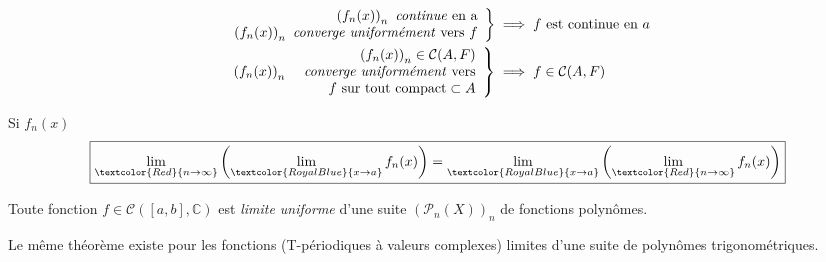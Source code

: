 \documentclass[11pt,a4paper,fleqn,pdftex]{report}
\begin{document}
\begin{theorem}

\begin{align*}
\left.
\begin{array}{r}
\left(f_n(x)\right)_{n}\text{ \emph{continue} en a}\\
\left(f_n(x)\right)_n\text{ \emph{converge uniformément} vers }f\\
\end{array}\right\rbrace &\implies f\text{ est continue en }a\\
\left.
\begin{array}{r r}
&\left(f_n(x)\right)_{n}\in\mathcal{C}(A,F)\\
\left(f_n(x)\right)_n&\text{ \emph{converge uniformément} vers}\\
&f \text{ sur tout compact} \subset A\\
\end{array}\right\rbrace &\implies f\in \mathcal{C}(A,F)\\
\end{align*}
\end{theorem}
\begin{itheorem}\label{Double Limite Fonctions} 
Si $f_n(x)$ 
\[\boxed{
\lim_{\textcolor{Red}{n\to\infty}}\left(\lim_{\textcolor{RoyalBlue}{x\to a}} f_n(x)\right)=\lim_{\textcolor{RoyalBlue}{x\to a}}\left(\lim_{\textcolor{Red}{n\to\infty}} f_n(x)\right)
}\]
\end{itheorem}
\begin{theorem}
Toute fonction $f\in \mathcal{C}([a,b],\mathbb{C})$ est \emph{limite uniforme} d'une suite $\left(\mathcal{P}_n(X)\right)_n$ de fonctions polynômes.
\end{theorem}
Le même théorème existe pour les fonctions (T-périodiques à valeurs complexes) limites d'une suite de polynômes trigonométriques.
\end{document}
